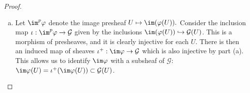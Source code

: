 \begin{problemset}
\begin{proof}
\begin{enumerate}[(a)]
			\item Let $\im^p\varphi$ denote the image presheaf $U\mapsto \im(\varphi(U)).$ Consider the inclusion map $\iota:\im^p\varphi \to \mathcal G$ given by the inclusions $\im(\varphi(U)) \hookrightarrow \mathcal G(U)$. This is a morphism of presheaves, and it is clearly injective for each $U$. There is then an induced map of sheaves $\iota^+: \im\varphi \to \mathcal G$ which is also injective by part (a). This allows us to identify $\im\varphi$ with a subsheaf of $\mathcal G$: $\im\varphi(U) = \iota^+(\im\varphi(U)) \subset \mathcal G(U)$.
		\end{enumerate}
	\end{proof}


\end{problemset}
